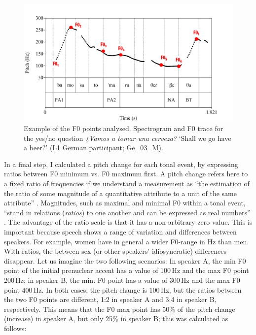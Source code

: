 \begin{figure}[p]
\includegraphics[width=\textwidth]{figures/a03HabilMethodology-img011.pdf}

\caption{Example of the F0 points analysed. Spectrogram and F0 trace for the yes/no question \textit{¿Vamos a tomar una cerveza?} ‘Shall we go have a beer?’ (L1 German participant; Ge\_03\_M).}
\label{fig:3.11}
\end{figure}


In a final step, I calculated a pitch change for each tonal event, by expressing ratios between F0 minimum vs. F0 maximum first. A pitch change refers here to a fixed ratio of frequencies if we understand a measurement as “the estimation of the ratio of some magnitude of a quantitative attribute to a unit of the same attribute” \citep[358]{Michell1997}. Magnitudes, such as maximal and minimal F0 within a tonal event, “stand in relations (\textit{ratios}) to one another and can be expressed as real numbers” \citep[356]{Michell1997}. The advantage of the ratio scale is that it has a non-arbitrary zero value. This is important because speech shows a range of variation and differences between speakers. For example, women have in general a wider F0-range in Hz than men. With ratios, the between-sex (or other speakers’ idiosyncratic) differences disappear. Let us imagine the two following scenarios: In speaker A, the min F0 point of the initial prenuclear accent has a value of 100\,Hz and the max F0 point 200\,Hz; in speaker B, the min. F0 point has a value of 300\,Hz and the max F0 point 400\,Hz. In both cases, the pitch change is 100\,Hz, but the ratios between the two F0 points are different, 1:2 in speaker A and 3:4 in speaker B, respectively. This means that the F0 max point has 50\% of the pitch change (increase) in speaker A, but only 25\% in speaker B; this was calculated as follows:

